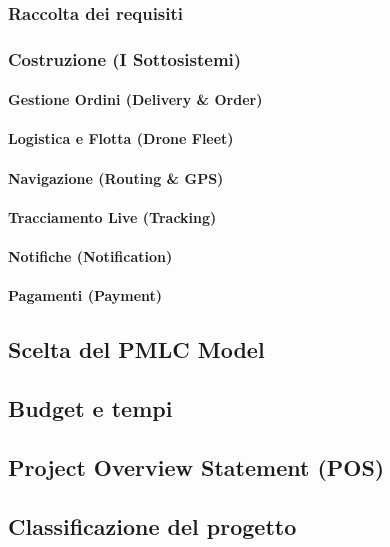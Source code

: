 \documentclass[12pt, a4paper]{article}
\begin{document}
\subsubsection{Raccolta dei requisiti}
\subsubsection{Costruzione (I Sottosistemi)}
\paragraph{Gestione Ordini (Delivery \& Order)}
\paragraph{Logistica e Flotta (Drone Fleet)}
\paragraph{Navigazione (Routing \& GPS)}
\paragraph{Tracciamento Live (Tracking)}
\paragraph{Notifiche (Notification)}
\paragraph{Pagamenti (Payment)}

\subsection{Scelta del PMLC Model}

\subsection{Budget e tempi}
\subsection{Project Overview Statement (POS)}
\subsection{Classificazione del progetto}
\end{document}
